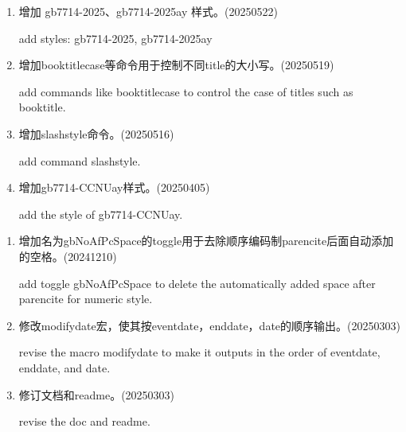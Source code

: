 \label{up:20250522}
\begin{enumerate}

\item 增加 gb7714-2025、gb7714-2025ay 样式。(20250522)

add styles: gb7714-2025, gb7714-2025ay

\item 增加booktitlecase等命令用于控制不同title的大小写。(20250519)

add commands like booktitlecase to control the case of titles such as booktitle.

\item 增加slashstyle命令。(20250516)

add command slashstyle.

\item 增加gb7714-CCNUay样式。(20250405)

add the style of gb7714-CCNUay.

\end{enumerate}


\label{up:20250303}
\begin{enumerate}

\item 增加名为gbNoAfPcSpace的toggle用于去除顺序编码制parencite后面自动添加的空格。(20241210)

add toggle gbNoAfPcSpace to delete the automatically added space after parencite for numeric style.

\item 修改modifydate宏，使其按eventdate，enddate，date的顺序输出。(20250303)

revise the macro modifydate to make it outputs in the order of  eventdate, enddate, and date.

\item 修订文档和readme。(20250303)

revise the doc and readme.
\end{enumerate}


